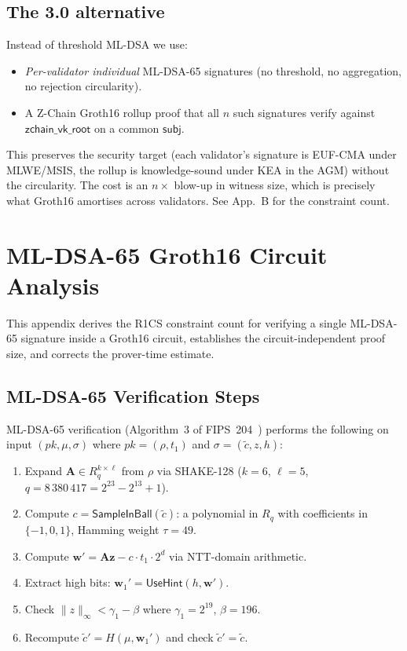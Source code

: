 \documentclass[11pt]{article}
\begin{document}
\subsection{The 3.0 alternative}

Instead of threshold ML-DSA we use:
\begin{itemize}[nosep]
  \item \emph{Per-validator individual} ML-DSA-65 signatures (no
    threshold, no aggregation, no rejection circularity).
  \item A Z-Chain Groth16 rollup proof that all $n$ such signatures
    verify against $\mathsf{zchain\_vk\_root}$ on a common
    $\mathsf{subj}$.
\end{itemize}

This preserves the security target (each validator's signature is
EUF-CMA under MLWE/MSIS, the rollup is knowledge-sound under KEA in the
AGM) without the circularity.  The cost is an $n \times $ blow-up in
witness size, which is precisely what Groth16 amortises across
validators.  See App.~B for the constraint count.

\section{ML-DSA-65 Groth16 Circuit Analysis}
\label{app:circuit}

This appendix derives the R1CS constraint count for verifying a single
ML-DSA-65 signature inside a Groth16 circuit, establishes the
circuit-independent proof size, and corrects the prover-time estimate.

\subsection{ML-DSA-65 Verification Steps}

ML-DSA-65 verification (Algorithm~3 of FIPS~204~\cite{nist-mldsa-spec})
performs the following on input $(pk, \mu, \sigma)$ where
$pk = (\rho, t_1)$ and $\sigma = (\tilde{c}, z, h)$:

\begin{enumerate}[nosep]
  \item Expand $\mathbf{A} \in R_q^{k \times \ell}$ from $\rho$
    via SHAKE-128 ($k=6$, $\ell=5$, $q = 8\,380\,417 = 2^{23} - 2^{13} + 1$).
  \item Compute $c = \mathsf{SampleInBall}(\tilde{c})$: a polynomial in
    $R_q$ with coefficients in $\{-1,0,1\}$, Hamming weight $\tau=49$.
  \item Compute $\mathbf{w}' = \mathbf{A}\mathbf{z} - c \cdot t_1 \cdot 2^d$
    via NTT-domain arithmetic.
  \item Extract high bits: $\mathbf{w}_1' = \mathsf{UseHint}(h, \mathbf{w}')$.
  \item Check $\|z\|_\infty < \gamma_1 - \beta$ where
    $\gamma_1 = 2^{19}$, $\beta = 196$.
  \item Recompute $\tilde{c}' = H(\mu, \mathbf{w}_1')$ and check
    $\tilde{c}' = \tilde{c}$.
\end{enumerate}
\end{document}
